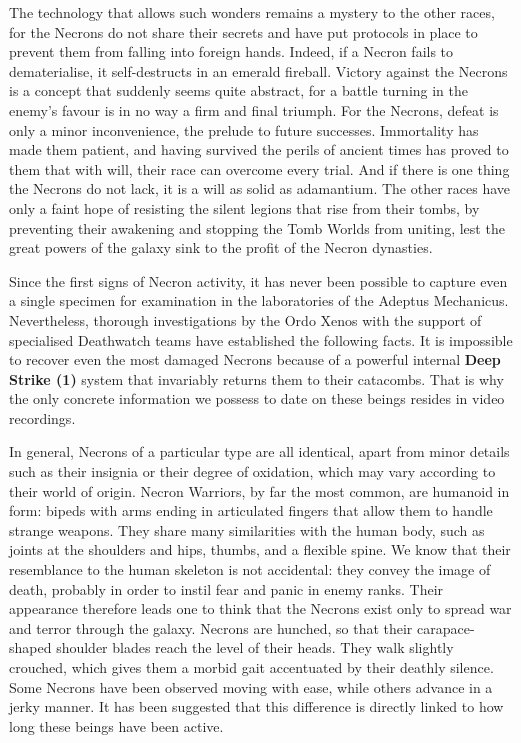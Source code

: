 The technology that allows such wonders remains a mystery to the other races, for the Necrons do not share their secrets and have put protocols in place to prevent them from falling into foreign hands. Indeed, if a Necron fails to dematerialise, it self-destructs in an emerald fireball. Victory against the Necrons is a concept that suddenly seems quite abstract, for a battle turning in the enemy's favour is in no way a firm and final triumph. For the Necrons, defeat is only a minor inconvenience, the prelude to future successes. Immortality has made them patient, and having survived the perils of ancient times has proved to them that with will, their race can overcome every trial. And if there is one thing the Necrons do not lack, it is a will as solid as adamantium. The other races have only a faint hope of resisting the silent legions that rise from their tombs, by preventing their awakening and stopping the Tomb Worlds from uniting, lest the great powers of the galaxy sink to the profit of the Necron dynasties.

Since the first signs of Necron activity, it has never been possible to capture even a single specimen for examination in the laboratories of the Adeptus Mechanicus. Nevertheless, thorough investigations by the Ordo Xenos with the support of specialised Deathwatch teams have established the following facts. It is impossible to recover even the most damaged Necrons because of a powerful internal \textbf{Deep Strike (1)} system that invariably returns them to their catacombs. That is why the only concrete information we possess to date on these beings resides in video recordings.

In general, Necrons of a particular type are all identical, apart from minor details such as their insignia or their degree of oxidation, which may vary according to their world of origin. Necron Warriors, by far the most common, are humanoid in form: bipeds with arms ending in articulated fingers that allow them to handle strange weapons. They share many similarities with the human body, such as joints at the shoulders and hips, thumbs, and a flexible spine. We know that their resemblance to the human skeleton is not accidental: they convey the image of death, probably in order to instil fear and panic in enemy ranks. Their appearance therefore leads one to think that the Necrons exist only to spread war and terror through the galaxy. Necrons are hunched, so that their carapace-shaped shoulder blades reach the level of their heads. They walk slightly crouched, which gives them a morbid gait accentuated by their deathly silence. Some Necrons have been observed moving with ease, while others advance in a jerky manner. It has been suggested that this difference is directly linked to how long these beings have been active.

